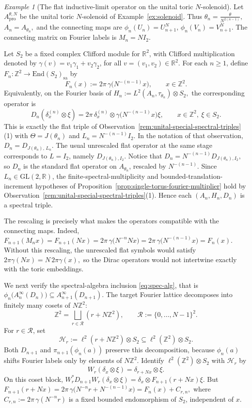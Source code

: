 \documentclass[11pt]{amsart}
\theoremstyle{definition}
\theoremstyle{remark}
\newtheorem{example}[theorem]{Example}
\newcommand{\Z}{\mathbb{Z}}
\newcommand{\R}{\mathbb{R}}
\newcommand{\GL}{\mathrm{GL}}
\newcommand{\ex}{\mathrm{pro}}
\newcommand{\End}{\mathrm{End}}
\begin{document}
\begin{example}[The flat inductive-limit operator on the unital toric $N$-solenoid]
\label{ex:solenoid-spectral}
Let $A_{\ex}^{\theta,N}$ be the unital toric $N$-solenoid of
Example~\ref{ex:solenoid}. Thus $\theta_n=\frac{\theta}{N^{2(n-1)}},$
$A_n=A_{\theta_n},$
and the connecting maps are $\phi_n(U_n)=U_{n+1}^N$, 
$\phi_n(V_n)=V_{n+1}^N.$ The connecting matrix on Fourier labels is $M_n=NI_2.$

Let $S_2$ be a fixed complex Clifford module for $\R^2$, with Clifford
multiplication denoted by $\gamma(v)=v_1\gamma_1+v_2\gamma_2$, for all $v=(v_1,v_2)\in\R^2.$
For each $n\geq1$, define $F_n\colon \Z^2\to \End(S_2)_{\mathrm{sa}}$
by
\[
F_n(x):=2\pi\,\gamma\bigl(N^{-(n-1)}x\bigr),
\qquad x\in\Z^2.
\]
Equivalently, on the Fourier basis of $H_n:=L^2(A_n,\tau_{\theta_n})\otimes S_2,$
the corresponding operator is
\[
D_n(\delta_x^{(n)}\otimes\xi)
=
2\pi\,\delta_x^{(n)}\otimes
\gamma\bigl(N^{-(n-1)}x\bigr)\xi,
\qquad x\in\Z^2,\ \xi\in S_2.
\]
This is exactly the flat triple of
Observation~\ref{rem:unital-special-spectral-triples}\textup{(1)} with $\Theta=J(\theta_n)$ and $L_n=N^{-(n-1)}I_2$. In the notation of that observation, $D_n=D_{J(\theta_n),\,L_n}.$
The usual unrescaled flat operator at the same stage corresponds to
$L=I_2$, namely $D_{J(\theta_n),I_2}$. 
Notice that $D_n=N^{-(n-1)}D_{J(\theta_n),I_2},$ so
$D_n$ is the standard flat operator on $A_{\theta_n}$, rescaled by
$N^{-(n-1)}$. Since $L_n\in\GL(2,\R)$, the finite-spectral-multiplicity and
bounded-translation-increment hypotheses of
Proposition~\ref{prop:single-torus-fourier-multiplier} hold by
Observation~\ref{rem:unital-special-spectral-triples}\textup{(1)}. Hence each $(A_n,H_n,D_n)$
is a spectral triple.

The rescaling is precisely what makes the operators compatible with the
connecting maps. Indeed, $F_{n+1}(M_nx)
=F_{n+1}(Nx)
=2\pi\,\gamma\bigl(N^{-n}Nx\bigr)
=2\pi\,\gamma\bigl(N^{-(n-1)}x\bigr)=F_n(x).$ Without this rescaling, the unrescaled flat symbols would satisfy $2\pi\gamma(Nx)=N\,2\pi\gamma(x),$
so the Dirac operators would not intertwine exactly with the toric embeddings.

We next verify the spectral-algebra inclusion \eqref{eq:spec-alg}, that is
$\phi_n\bigl(A_n^\infty(D_n)\bigr)\subseteq A_{n+1}^\infty(D_{n+1}).$
The target Fourier lattice decomposes into finitely many cosets of
$N\Z^2$:
\[
\Z^2=\bigsqcup_{r\in\mathcal R}(r+N\Z^2),
\qquad
\mathcal R:=\{0,\ldots,N-1\}^2.
\]
For $r\in\mathcal R$, set
\[
\mathcal H_r:=\ell^2(r+N\Z^2)\otimes S_2
\subseteq
\ell^2(\Z^2)\otimes S_2.
\]
Both $D_{n+1}$ and $\pi_{n+1}(\phi_n(a))$ preserve this decomposition,
because $\phi_n(a)$ shifts Fourier labels only by elements of $N\Z^2$. Identify $\ell^2(\Z^2)\otimes S_2$ with $\mathcal H_r$ by
\[
W_r(\delta_x\otimes\xi)=\delta_{r+Nx}\otimes\xi.
\]
On this coset block, $W_r^*D_{n+1}W_r(\delta_x\otimes\xi)=\delta_x\otimes F_{n+1}(r+Nx)\xi.$ But $F_{n+1}(r+Nx)=2\pi\,\gamma\bigl(N^{-n}r+N^{-(n-1)}x\bigr)=F_n(x)+C_{r,n},$
where $C_{r,n}:=2\pi\,\gamma(N^{-n}r)$
is a fixed bounded endomorphism of $S_2$, independent of $x$.


\end{example}
\end{document}
